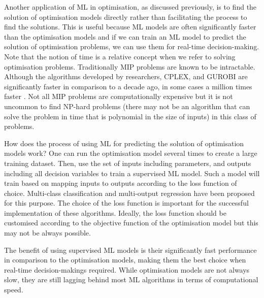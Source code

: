 \documentclass[graybox]{svmult}
\begin{document}
Another application of ML in optimisation, as discussed previously, is to find the solution of optimisation models directly rather than facilitating the process to find the solutions. This is useful because ML models are often significantly faster than the optimisation models and if we can train an ML model to predict the solution of optimisation problems, we can use them for real-time decision-making. Note that the notion of time is a relative concept when we refer to solving optimisation problems. Traditionally MIP problems are known to be intractable. Although the algorithms developed by researchers, CPLEX, and GUROBI are significantly faster in comparison to a decade ago, in some cases a million times faster \cite{bertsimas2019machine}. Not all MIP problems are computationally expensive but it is not uncommon to find NP-hard problems (there may not be an algorithm that can solve the problem in time that is polynomial in the size of inputs) in this class of problems.



How does the process of using ML for predicting the solution of optimisation models work? One can run the optimisation model several times to create a large training dataset. Then, use the set of inputs including parameters, and outputs including all decision variables to train a supervised ML model.  Such a model will train based on mapping inputs to outputs according to the loss function of choice. Multi-class classification \cite{bertsimas2019machine} and multi-output regression \cite{abolghasemi2021effectively} have been proposed for this purpose. The choice of the loss function is important for the successful implementation of these algorithms. Ideally, the loss function should be customised according to the objective function of the optimisation model but this may not be always possible. 
 

The benefit of using supervised ML models is their significantly fast performance in comparison to the optimisation models, making them the best choice when real-time decision-makings required. While optimisation models are not always slow, they are still lagging behind most ML algorithms in terms of computational speed.  
\end{document}
